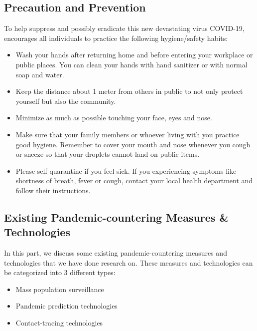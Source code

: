     \subsection{Precaution and Prevention}
      \par To help suppress and possibly eradicate this new devastating virus COVID-19, \textcite{Q&A_WHO} encourages all individuals to practice the following hygiene/safety habits:
      \begin{itemize}
        \item Wash your hands after returning home and before entering your workplace or public places. You can clean your hands with hand sanitizer or with normal soap and water.
        \item Keep the distance about 1 meter from others in public to not only protect yourself but also the community.
        \item Minimize as much as possible touching your face, eyes and nose.
        \item Make sure that your family members or whoever living with you practice good hygiene. Remember to cover your mouth and nose whenever you cough or sneeze so that your droplets cannot land on public items.
        \item Please self-quarantine if you feel sick. If you experiencing symptoms like shortness of breath, fever or cough, contact your local health department and follow their instructions.
      \end{itemize}

    \subsection{Existing Pandemic-countering Measures \& Technologies}
      \par In this part, we discuss some existing pandemic-countering measures and technologies that we have done research on. These measures and technologies can be categorized into 3 different types:
      \begin{itemize}
        \item Mass population surveillance
        \item Pandemic prediction technologies
        \item Contact-tracing technologies
      \end{itemize}

